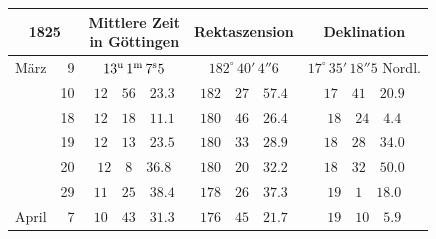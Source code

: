 \begin{center}
\begingroup\small\setlength{\tabcolsep}{4pt}
\begin{tabular}{lr|c|c|c}
\multicolumn{2}{c|}{1825} & \shortstack{Mittlere Zeit\\in Göttingen} & Rektaszension & Deklination \\
\hline
März & 9 & $13^{\rm u}\,1^{\rm m}\,7^{\rm s}5$ & $182^{\circ}\,40'\,4''6$ & $17^{\circ}\,35'\,18''5$ Nordl. \\
 & 10 & $12\quad56\quad23.3$ & $182\quad27\quad57.4$ & $17\quad41\quad20.9$ \\
 & 18 & $12\quad18\quad11.1$ & $180\quad46\quad26.4$ & $18\quad24\quad4.4$ \\
 & 19 & $12\quad13\quad23.5$ & $180\quad33\quad28.9$ & $18\quad28\quad34.0$ \\
 & 20 & $12\quad8\quad36.8$ & $180\quad20\quad32.2$ & $18\quad32\quad50.0$ \\
 & 29 & $11\quad25\quad38.4$ & $178\quad26\quad37.3$ & $19\quad1\quad18.0$ \\
April & 7 & $10\quad43\quad31.3$ & $176\quad45\quad21.7$ & $19\quad10\quad5.9$ \\
\end{tabular}
\endgroup
\end{center}
